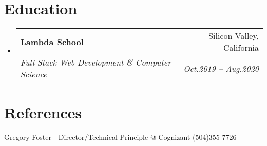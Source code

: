 \documentclass[letterpaper,12pt]{article}
\makeatletter
\newcommand{\resumeSubheading}[4]{
  \vspace{-1pt}\item{
    \begin{tabular*}{0.97\textwidth}{l@{\extracolsep{\fill}}r}
      \textbf{#1} & #2 \\
      \textit{\small#3} & \textit{\small #4} \\
    \end{tabular*}\vspace{-5pt}}
}
\newcommand{\resumeSubHeadingListStart}{\begin{itemize}[leftmargin=*]}
\newcommand{\resumeSubHeadingListEnd}{\end{itemize}}
\makeatother
\begin{document}
  \section{Education}
  \resumeSubHeadingListStart
  \resumeSubheading
  {Lambda School}{Silicon Valley, California}
  {Full Stack Web Development \& Computer Science}{Oct.2019 -- Aug.2020}
  \resumeSubHeadingListEnd

  \section{References}
    Gregory Foster - Director/Technical Principle @ Cognizant (504)355-7726

\end{document}
